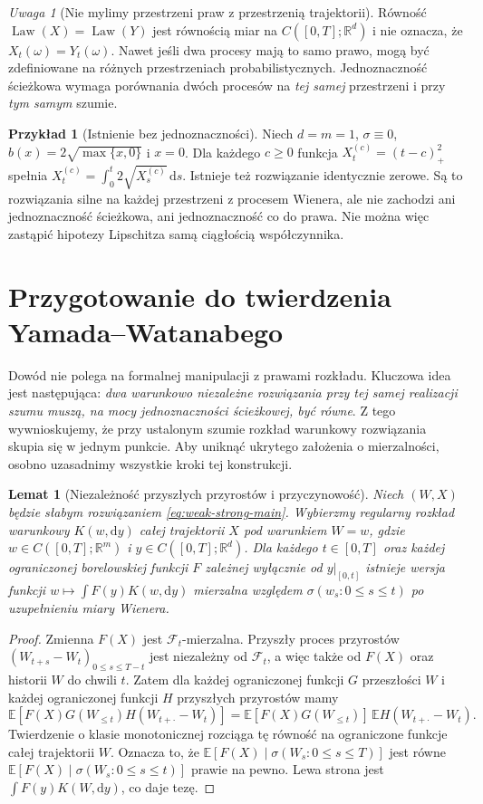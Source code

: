 \documentclass[11pt,a4paper,oneside]{report}
\numberwithin{equation}{chapter}
\theoremstyle{plain}
\newtheorem{lemat}[twierdzenie]{Lemat}
\theoremstyle{definition}
\newtheorem{przyklad}{Przykład}[chapter]
\theoremstyle{remark}
\newtheorem{uwaga}{Uwaga}[chapter]
\newcommand{\R}{\mathbb{R}}
\newcommand{\E}{\mathbb{E}}
\newcommand{\Law}{\operatorname{Law}}
\newcommand{\calF}{\mathcal{F}}
\newcommand{\dd}{\mathrm{d}}
\begin{document}
\begin{uwaga}[Nie mylimy przestrzeni praw z przestrzenią trajektorii]
Równość $\Law(X)=\Law(Y)$ jest równością miar na
$C([0,T];\R^d)$ i nie oznacza, że $X_t(\omega)=Y_t(\omega)$.
Nawet jeśli dwa procesy mają to samo prawo, mogą być
zdefiniowane na różnych przestrzeniach probabilistycznych.
Jednoznaczność ścieżkowa wymaga porównania dwóch procesów
na \emph{tej samej} przestrzeni i przy \emph{tym samym} szumie.
\end{uwaga}

\begin{przyklad}[Istnienie bez jednoznaczności]
Niech $d=m=1$, $\sigma\equiv0$,
$b(x)=2\sqrt{\max\{x,0\}}$ i $x=0$.
Dla każdego $c\ge0$ funkcja
$X_t^{(c)}=(t-c)_+^2$ spełnia
$X_t^{(c)}=\int_0^t2\sqrt{X_s^{(c)}}\,\dd s$.
Istnieje też rozwiązanie identycznie zerowe.
Są to rozwiązania silne na każdej przestrzeni z procesem
Wienera, ale nie zachodzi ani jednoznaczność ścieżkowa,
ani jednoznaczność co do prawa. Nie można więc zastąpić
hipotezy Lipschitza samą ciągłością współczynnika.
\end{przyklad}

\section{Przygotowanie do twierdzenia Yamada--Watanabego}

Dowód nie polega na formalnej manipulacji z prawami
rozkładu. Kluczowa idea jest następująca: \emph{dwa
warunkowo niezależne rozwiązania przy tej samej realizacji
szumu muszą, na mocy jednoznaczności ścieżkowej, być równe}.
Z tego wywnioskujemy, że przy ustalonym szumie rozkład
warunkowy rozwiązania skupia się w jednym punkcie.
Aby uniknąć ukrytego założenia o mierzalności, osobno
uzasadnimy wszystkie kroki tej konstrukcji.

\begin{lemat}[Niezależność przyszłych przyrostów i przyczynowość]
\label{lem:YW-causality}
Niech $(W,X)$ będzie słabym rozwiązaniem
\eqref{eq:weak-strong-main}. Wybierzmy regularny rozkład
warunkowy $K(w,\dd y)$ całej trajektorii $X$ pod warunkiem
$W=w$, gdzie $w\in C([0,T];\R^m)$ i
$y\in C([0,T];\R^d)$. Dla każdego $t\in[0,T]$ oraz
każdej ograniczonej borelowskiej funkcji $F$ zależnej
wyłącznie od $y|_{[0,t]}$ istnieje wersja funkcji
$w\mapsto\int F(y)K(w,\dd y)$ mierzalna względem
$\sigma(w_s:0\le s\le t)$ po uzupełnieniu miary Wienera.
\end{lemat}
\begin{proof}
Zmienna $F(X)$ jest $\calF_t$-mierzalna.
Przyszły proces przyrostów $(W_{t+s}-W_t)_{0\le s\le T-t}$
jest niezależny od $\calF_t$, a więc także od $F(X)$
oraz historii $W$ do chwili $t$. Zatem dla każdej ograniczonej
funkcji $G$ przeszłości $W$ i każdej ograniczonej funkcji $H$
przyszłych przyrostów mamy
\[
 \E[F(X)G(W_{\le t})H(W_{t+\cdot}-W_t)]
 =\E[F(X)G(W_{\le t})]\,\E H(W_{t+\cdot}-W_t).
\]
Twierdzenie o klasie monotonicznej rozciąga tę równość
na ograniczone funkcje całej trajektorii $W$. Oznacza to,
że $\E[F(X)\mid\sigma(W_s:0\le s\le T)]$ jest równe
$\E[F(X)\mid\sigma(W_s:0\le s\le t)]$ prawie na pewno.
Lewa strona jest $\int F(y)K(W,\dd y)$, co daje tezę.
\end{proof}
\end{document}
